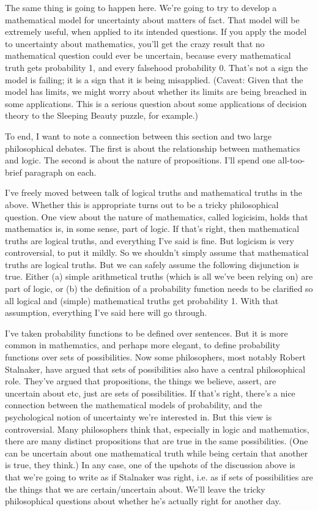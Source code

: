 The same thing is going to happen here. We're going to try to develop a mathematical model for uncertainty about matters of fact. That model will be extremely useful, when applied to its intended questions. If you apply the model to uncertainty about mathematics, you'll get the crazy result that no mathematical question could ever be uncertain, because every mathematical truth gets probability 1, and every falsehood probability 0. That's not a sign the model is failing; it is a sign that it is being misapplied. (Caveat: Given that the model has limits, we might worry about whether its limits are being breached in some applications. This is a serious question about some applications of decision theory to the Sleeping Beauty puzzle, for example.)

To end, I want to note a connection between this section and two large philosophical debates. The first is about the relationship between mathematics and logic. The second is about the nature of propositions. I'll spend one all-too-brief paragraph on each.

I've freely moved between talk of logical truths and mathematical truths in the above. Whether this is appropriate turns out to be a tricky philosophical question. One view about the nature of mathematics, called logicisim, holds that mathematics is, in some sense, part of logic. If that's right, then mathematical truths are logical truths, and everything I've said is fine. But logicism is very controversial, to put it mildly. So we shouldn't simply assume that mathematical truths are logical truths. But we can safely assume the following disjunction is true. Either (a) simple arithmetical truths (which is all we've been relying on) are part of logic, or (b) the definition of a probability function needs to be clarified so all logical and (simple) mathematical truths get probability 1. With that assumption, everything I've said here will go through.

I've taken probability functions to be defined over sentences. But it is more common in mathematics, and perhaps more elegant, to define probability functions over sets of possibilities. Now some philosophers, most notably Robert Stalnaker, have argued that sets of possibilities also have a central philosophical role. They've argued that propositions, the things we believe, assert, are uncertain about etc, just are sets of possibilities. If that's right, there's a nice connection between the mathematical models of probability, and the psychological notion of uncertainty we're interested in. But this view is controversial. Many philosophers think that, especially in logic and mathematics, there are many distinct propositions that are true in the same possibilities. (One can be uncertain about one mathematical truth while being certain that another is true, they think.) In any case, one of the upshots of the discussion above is that we're going to write as if Stalnaker was right, i.e. as if sets of possibilities are the things that we are certain/uncertain about. We'll leave the tricky philosophical questions about whether he's actually right for another day.

